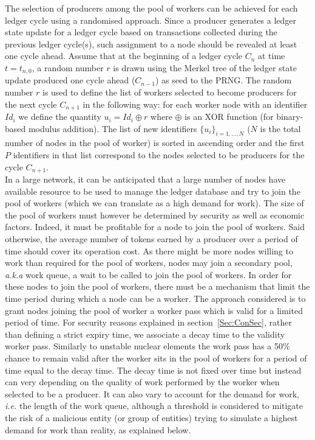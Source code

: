
The selection of producers among the pool of workers can be achieved for each ledger cycle using a randomised approach. Since a producer generates a ledger state update for a ledger cycle based on transactions collected during the previous ledger cycle(s), such assignment to a node should be revealed at least one cycle ahead. Assume that at the beginning of a ledger cycle $C_n$ at time $t = t_{n,0}$, a random number $r$ is drawn using the Merkel tree of the ledger state update produced one cycle ahead ($C_{n-1}$) as seed to the PRNG. The random number $r$ is used to define the list of workers selected to become producers for the next cycle $C_{n+1}$ in the following way: for each worker node with an identifier $Id_i$ we define the quantity $u_i = Id_i \oplus r$ where $\oplus$ is an XOR function (for binary-based modulus addition). The list of new identifiers $\{u_i \}_{i=1,...,N}$ ($N$ is the total number of nodes in the pool of worker) is sorted in ascending order and the first $P$ identifiers in that list correspond to the nodes selected to be producers for the cycle $C_{n+1}$.\\


In a large network, it can be anticipated that a large number of nodes have available resource to be used to manage the ledger database and try to join the pool of workers (which we can translate as a high demand for work).
The size of the pool of workers must however be determined by security as well as economic factors. Indeed, it must be profitable for a node to join the pool of workers. Said otherwise, the average number of tokens earned by a producer over a period of time should cover its operation cost. As there might be more nodes willing to work than required for the pool of workers, nodes may join a secondary pool, \textit{a.k.a} work queue, a wait to be called to join the pool of workers. In order for these nodes to join the pool of workers, there must be a mechanism that limit the time period during which a node can be a worker. The approach considered is to grant nodes joining the pool of worker a worker pass which is valid for a limited period of time. For security reasons explained in section~\ref{Sec:ConSec}, rather than defining a strict expiry time, we associate a decay time to the validity worker pass. Similarly to unstable nuclear elements the work pass has a 50\% chance to remain valid after the worker sits in the pool of workers for a period of time equal to the decay time. The decay time is not fixed over time but instead can very depending on the quality of work performed by the worker when selected to be a producer. It can also vary to account for the demand for work, \textit{i.e.} the length of the work queue, although a threshold is considered to mitigate the risk of a malicious entity (or group of entities) trying to simulate a highest demand for work than reality, as explained below.\\ 


